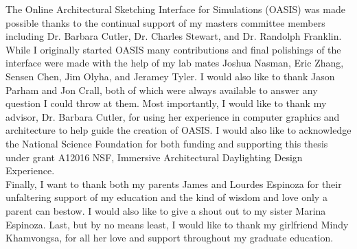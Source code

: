 

The Online Architectural Sketching Interface for Simulations (OASIS) was made possible thanks to the continual support of my masters committee members including Dr. Barbara Cutler, Dr. Charles Stewart, and Dr. Randolph Franklin.  While I originally started OASIS many contributions and final polishings of the interface were made with the help of my lab mates Joshua Nasman, Eric Zhang, Sensen Chen, Jim Olyha, and Jeramey Tyler. I would also like to thank Jason Parham and Jon Crall, both of which were always  available to answer any question I could throw at them. Most importantly, I would like to thank my advisor, Dr. Barbara Cutler, for using her experience in computer graphics and architecture to help guide the creation of OASIS. I would also like to acknowledge the National Science Foundation for both funding and supporting this thesis under grant A12016 NSF, Immersive Architectural Daylighting Design Experience.\\

Finally, I want to thank both my parents James and Lourdes Espinoza for their unfaltering support of my education and the kind of wisdom and love only a parent can bestow.  I would also like to give a shout out to my sister Marina Espinoza. Last, but by no means least, I would like to thank my girlfriend Mindy Khamvongsa, for all her love and support throughout my graduate education.


